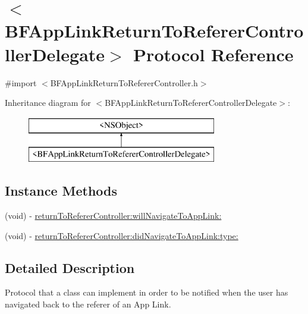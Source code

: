 \hypertarget{protocol_b_f_app_link_return_to_referer_controller_delegate-p}{}\section{$<$B\+F\+App\+Link\+Return\+To\+Referer\+Controller\+Delegate$>$ Protocol Reference}
\label{protocol_b_f_app_link_return_to_referer_controller_delegate-p}


{\ttfamily \#import $<$B\+F\+App\+Link\+Return\+To\+Referer\+Controller.\+h$>$}

Inheritance diagram for $<$B\+F\+App\+Link\+Return\+To\+Referer\+Controller\+Delegate$>$\+:\begin{figure}[H]
\begin{center}
\leavevmode
\includegraphics[height=2.000000cm]{protocol_b_f_app_link_return_to_referer_controller_delegate-p}
\end{center}
\end{figure}
\subsection*{Instance Methods}
\begin{DoxyCompactItemize}
\item 
(void) -\/ \hyperlink{protocol_b_f_app_link_return_to_referer_controller_delegate-p_aaea360a5dbe5f3676c5821fbdcad9913}{return\+To\+Referer\+Controller\+:will\+Navigate\+To\+App\+Link\+:}
\item 
(void) -\/ \hyperlink{protocol_b_f_app_link_return_to_referer_controller_delegate-p_a204e256c1d32c7906a11662bed988c2a}{return\+To\+Referer\+Controller\+:did\+Navigate\+To\+App\+Link\+:type\+:}
\end{DoxyCompactItemize}


\subsection{Detailed Description}
Protocol that a class can implement in order to be notified when the user has navigated back to the referer of an App Link. 

